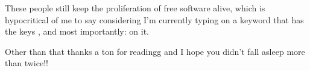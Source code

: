 \documentclass[sigplan,screen]{acmart}
\begin{document}
These people still keep the proliferation of free software alive, which is hypocritical of me to say considering I'm currently typing on a keyword that has the keys \cmdkey \ctlkey \optkey, and most importantly: \applekey    on it.

Other than that thanks a ton for readingg and I hope you didn't fall asleep more than twice!!




\end{document}
